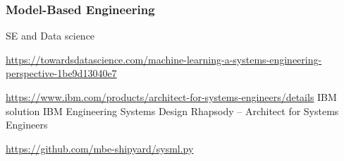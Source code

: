 \newpage 

\begin{frame}
\frametitle{Model-Based Engineering  }
\begin{block}{SE and Data science}

\url{https://towardsdatascience.com/machine-learning-a-systems-engineering-perspective-1be9d13040e7}

\url{https://www.ibm.com/products/architect-for-systems-engineers/details} IBM solution   IBM Engineering Systems Design Rhapsody – Architect for Systems Engineers

\url{https://github.com/mbe-shipyard/sysml.py}

\end{block}
\end{frame}


